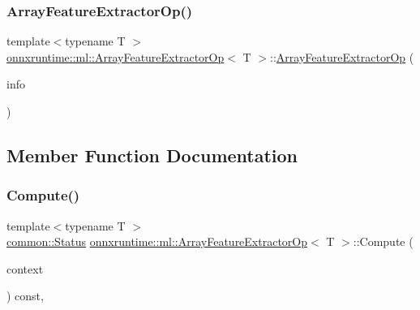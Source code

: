 \subsubsection{\texorpdfstring{Array\+Feature\+Extractor\+Op()}{ArrayFeatureExtractorOp()}}
{\footnotesize\ttfamily template$<$typename T $>$ \\
\mbox{\hyperlink{classonnxruntime_1_1ml_1_1ArrayFeatureExtractorOp}{onnxruntime\+::ml\+::\+Array\+Feature\+Extractor\+Op}}$<$ T $>$\+::\mbox{\hyperlink{classonnxruntime_1_1ml_1_1ArrayFeatureExtractorOp}{Array\+Feature\+Extractor\+Op}} (\begin{DoxyParamCaption}\item[{const \mbox{\hyperlink{classonnxruntime_1_1OpKernelInfo}{Op\+Kernel\+Info}} \&}]{info }\end{DoxyParamCaption})\hspace{0.3cm}{\ttfamily [explicit]}}



\subsection{Member Function Documentation}
\mbox{\label{classonnxruntime_1_1ml_1_1ArrayFeatureExtractorOp_a4becdca227976dbb9dbf2ecec4bb0ad5}} 
\subsubsection{\texorpdfstring{Compute()}{Compute()}}
{\footnotesize\ttfamily template$<$typename T $>$ \\
\mbox{\hyperlink{classonnxruntime_1_1common_1_1Status}{common\+::\+Status}} \mbox{\hyperlink{classonnxruntime_1_1ml_1_1ArrayFeatureExtractorOp}{onnxruntime\+::ml\+::\+Array\+Feature\+Extractor\+Op}}$<$ T $>$\+::Compute (\begin{DoxyParamCaption}\item[{\mbox{\hyperlink{classonnxruntime_1_1OpKernelContext}{Op\+Kernel\+Context}} $\ast$}]{context }\end{DoxyParamCaption}) const\hspace{0.3cm}{\ttfamily [override]}, {\ttfamily [virtual]}}



